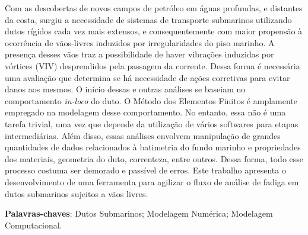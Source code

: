 
\setlength{\absparsep}{18pt} %
\begin{resumo}

    Com as descobertas de novos campos de petróleo em águas profundas, e distantes da costa, surgiu a necessidade de sistemas de transporte submarinos utilizando dutos rígidos cada vez mais extensos, e consequentemente com maior propensão à ocorrência de vãos-livres induzidos por irregularidades do piso marinho.
    A presença desses vãos traz a possibilidade de haver vibrações induzidas por vórtices (VIV) desprendidos pela passagem da corrente.
    Dessa forma é necessária uma avaliação que determina se há necessidade de ações corretivas para evitar danos aos mesmos.
    O início dessas e outras análises se baseiam no comportamento \textit{in-loco} do duto.
    O Método dos Elementos Finitos é amplamente empregado na modelagem desse comportamento.
    No entanto, essa não é uma tarefa trivial, uma vez que depende da utilização de vários softwares para etapas intermediárias.
    Além disso, essas análises envolvem manipulação de grandes quantidades de dados relacionados à batimetria do fundo marinho e propriedades dos materiais, geometria do duto, correnteza, entre outros.
    Dessa forma, todo esse processo costuma ser demorado e passível de erros.
    Este trabalho apresenta o desenvolvimento de uma ferramenta para agilizar o fluxo de análise de fadiga em dutos submarinos sujeitos a vãos livres.
    

 \textbf{Palavras-chaves}: Dutos Submarinos; Modelagem Numérica; Modelagem Computacional.
\end{resumo}

